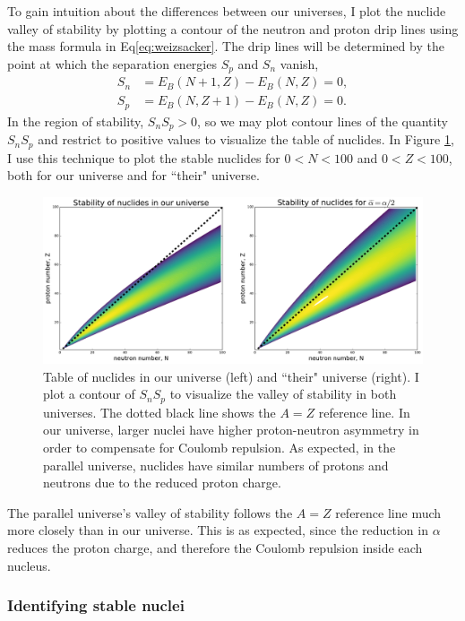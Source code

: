 \documentclass[%
 reprint,
 amsmath,amssymb,
 aps,
]{revtex4-1}
\begin{document}
To gain intuition about the differences between our universes, I plot the nuclide valley of stability by plotting a contour of the neutron and proton drip lines using the mass formula in Eq\eqref{eq:weizsacker}. The drip lines will be determined by the point at which the separation energies $S_p$ and $S_n$ vanish,
\begin{align}
	S_n &= E_B(N+1, Z) - E_B(N, Z) = 0, \\
	S_p &= E_B(N, Z+1) - E_B(N, Z) = 0.
\end{align}
In the region of stability, $S_n S_p > 0$, so we may plot contour lines of the quantity $S_n S_p$ and restrict to positive values to visualize the table of nuclides. In Figure \ref{fig:nuclides}, I use this technique to plot the stable nuclides for $0 < N < 100$ and $0 < Z < 100$, both for our universe and for ``their" universe.

\begin{figure}[h!]
\centering
\includegraphics[width=\linewidth]{fig/nuclides.pdf}
\caption{\label{fig:nuclides}Table of nuclides in our universe (left) and ``their" universe (right). I plot a contour of $S_n S_p$ to visualize the valley of stability in both universes. The dotted black line shows the $A=Z$ reference line. In our universe, larger nuclei have higher proton-neutron asymmetry in order to compensate for Coulomb repulsion. As expected, in the parallel universe, nuclides have similar numbers of protons and neutrons due to the reduced proton charge.}
\end{figure}

The parallel universe's valley of stability follows the $A=Z$ reference line much more closely than in our universe. This is as expected, since the reduction in $\alpha$ reduces the proton charge, and therefore the Coulomb repulsion inside each nucleus.

\subsubsection{\label{sec:stable_nuclei}Identifying stable nuclei}
\end{document}

